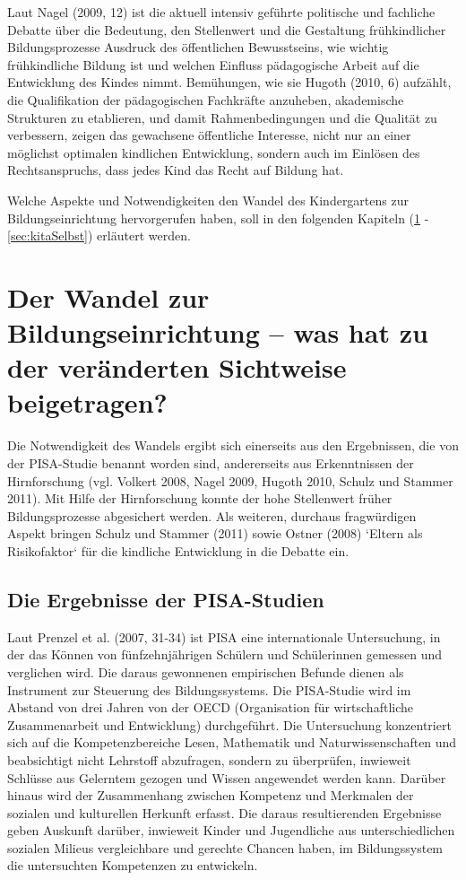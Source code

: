 Laut Nagel (2009, 12) ist die aktuell intensiv geführte politische und fachliche Debatte über die Bedeutung, den Stellenwert und die Gestaltung frühkindlicher Bildungsprozesse Ausdruck des öffentlichen Bewusstseins, wie wichtig frühkindliche Bildung ist und welchen Einfluss pädagogische Arbeit auf die Entwicklung des Kindes nimmt. Bemühungen, wie sie Hugoth (2010, 6) aufzählt, die Qualifikation der pädagogischen Fachkräfte anzuheben, akademische Strukturen zu etablieren, und damit Rahmenbedingungen und die Qualität zu verbessern, zeigen das gewachsene öffentliche Interesse, nicht nur an einer möglichst optimalen kindlichen Entwicklung, sondern auch im Einlösen des Rechtsanspruchs, dass jedes Kind das Recht auf Bildung hat. 

Welche Aspekte und Notwendigkeiten den Wandel des Kindergartens zur Bildungseinrichtung hervorgerufen haben, soll in den folgenden Kapiteln (\ref{sec:kitaWandel} - \ref{sec:kitaSelbst}) erläutert werden. 

\section{Der Wandel zur Bildungseinrichtung – was hat zu der veränderten Sichtweise beigetragen?}\label{sec:kitaWandel}
Die Notwendigkeit des Wandels ergibt sich einerseits aus den Ergebnissen, die von der PISA-Studie benannt worden sind, andererseits aus Erkenntnissen der Hirnforschung (vgl. Volkert 2008, Nagel 2009, Hugoth 2010, Schulz und Stammer 2011). Mit Hilfe der Hirnforschung konnte der hohe Stellenwert früher Bildungsprozesse abgesichert werden. Als weiteren, durchaus fragwürdigen Aspekt bringen Schulz und Stammer (2011) sowie Ostner (2008) ‘Eltern als Risikofaktor‘ für die kindliche Entwicklung in die Debatte ein. 

\subsection{Die Ergebnisse der PISA-Studien}
Laut Prenzel et al. (2007, 31-34) ist PISA eine internationale Untersuchung, in der das Können von fünfzehnjährigen Schülern und Schülerinnen gemessen und verglichen wird. Die daraus gewonnenen empirischen Befunde dienen als Instrument zur Steuerung des Bildungssystems. Die PISA-Studie wird im Abstand von drei Jahren von der OECD (Organisation für wirtschaftliche Zusammenarbeit und Entwicklung) durchgeführt. Die Untersuchung konzentriert sich auf die Kompetenzbereiche Lesen, Mathematik und Naturwissenschaften und beabsichtigt nicht Lehrstoff abzufragen, sondern zu überprüfen, inwieweit Schlüsse aus Gelerntem gezogen und Wissen angewendet werden kann. Darüber hinaus wird der Zusammenhang zwischen Kompetenz und Merkmalen der sozialen und kulturellen Herkunft erfasst. Die daraus resultierenden Ergebnisse geben Auskunft darüber, inwieweit Kinder und Jugendliche aus unterschiedlichen sozialen Milieus vergleichbare und gerechte Chancen haben, im Bildungssystem die untersuchten Kompetenzen zu entwickeln. 

